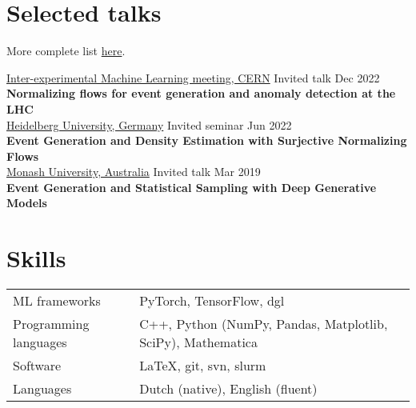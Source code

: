 \documentclass[a4paper,12pt]{article}
\begin{document}
\section{Selected talks}
More complete list \href{https://rbvh.github.io/}{here}.

\underline{Inter-experimental Machine Learning meeting, CERN} Invited talk \hfill Dec 2022 \\[1.75pt]
\textbf{Normalizing flows for event generation and anomaly detection at the LHC} \\[3.5pt]
\underline{Heidelberg University, Germany} Invited seminar \hfill Jun 2022 \\[1.75pt]
\textbf{Event Generation and Density Estimation with Surjective Normalizing Flows}  \\[3.5pt]
\underline{Monash University, Australia} Invited talk \hfill Mar 2019 \\[1.75pt]
\textbf{Event Generation and Statistical Sampling with Deep Generative Models} 

\section{Skills}
\begin{tabularx}{\linewidth}{@{}l X@{}}
ML frameworks & \normalsize{PyTorch, TensorFlow, dgl} \\
Programming languages & \normalsize{C++, Python (NumPy, Pandas, Matplotlib, SciPy), Mathematica} \\
Software & \normalsize{LaTeX, git, svn, slurm}  \\
Languages & \normalsize{Dutch (native), English (fluent)}
\end{tabularx}

\vfill
{}
\end{document}
